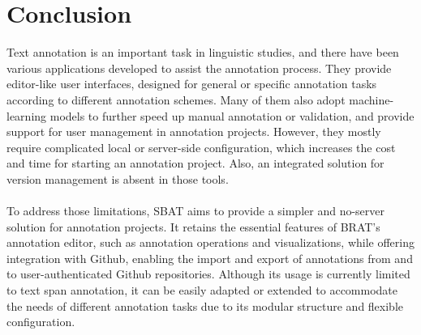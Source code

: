 \documentclass[12ptm a4paper]{article}
\begin{document}
\section{Conclusion}
Text annotation is an important task in linguistic studies, and there have been various applications developed to assist the annotation process. They provide editor-like user interfaces, designed for general or specific annotation tasks according to different annotation schemes. Many of them also adopt machine-learning models to further speed up manual annotation or validation, and provide support for user management in annotation projects. However, they mostly require complicated local or server-side configuration, which increases the cost and time for starting an annotation project. Also, an integrated solution for version management is absent in those tools.\\
\\
To address those limitations, SBAT aims to provide a simpler and no-server solution for annotation projects. It retains the essential features of BRAT's annotation editor, such as annotation operations and visualizations, while offering integration with Github, enabling the import and export of annotations from and to user-authenticated Github repositories. Although its usage is currently limited to text span annotation, it can be easily adapted or extended to accommodate the needs of different annotation tasks due to its modular structure and flexible configuration.\\ 










\newpage


\end{document}
